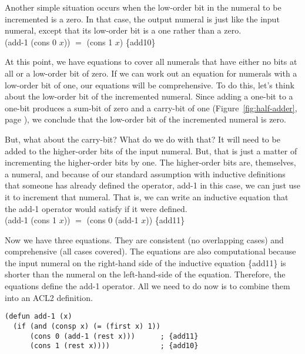 Another simple situation occurs when the low-order bit in the
numeral to be incremented is a zero.
In that case, the output numeral is
just like the input numeral, except that its
low-order bit is a one rather than a zero.
\\
\vspace{2mm}
\hspace*{2cm}
\textsf{(add-1 (cons 0 $x$))} $=$ \textsf{(cons 1 $x$)}    \hfill \{add10\}

At this point, we have equations to cover all numerals
that have either no bits at all or a low-order bit
of zero. If we can work out an equation for numerals
with a low-order bit of one, our equations will be comprehensive.
To do this, let's think about the
low-order bit of the incremented numeral.
Since adding a one-bit to a one-bit produces a sum-bit
of zero and a carry-bit of one
(Figure~\ref{fig:half-adder}, page \pageref{fig:half-adder}),
we conclude that the low-order bit of the incremented numeral
is zero.

But, what about the carry-bit? What do we do with that?
It will need to be added to the higher-order bits of
the input numeral. But, that is just a matter of incrementing
the higher-order bits by one.
The higher-order bits are, themselves, a numeral,
and because of our standard assumption with inductive definitions that
someone has already defined the operator, \textsf{add-1} in this case,
we can just use it to increment that numeral.
That is, we can write an inductive equation that the \textsf{add-1} operator
would satisfy if it were defined.
\\
\vspace{2mm}
\hspace*{2cm}
\textsf{(add-1 (cons 1 $x$))} $=$ \textsf{(cons 0 (add-1 $x$))}   \hfill \{add11\}

Now we have three equations.
They are consistent (no overlapping cases) and
comprehensive (all cases covered).
The equations are also computational because the input numeral
on the right-hand side of the inductive equation
\{add11\} is shorter than
the numeral on the left-hand-side of the equation.
Therefore, the equations define the \textsf{add-1} operator.
All we need to do now is to combine them into an ACL2 definition.

\label{add-1-defun}
\begin{Verbatim}
(defun add-1 (x)
  (if (and (consp x) (= (first x) 1))
      (cons 0 (add-1 (rest x)))      ; {add11}
      (cons 1 (rest x))))            ; {add10}
\end{Verbatim}

